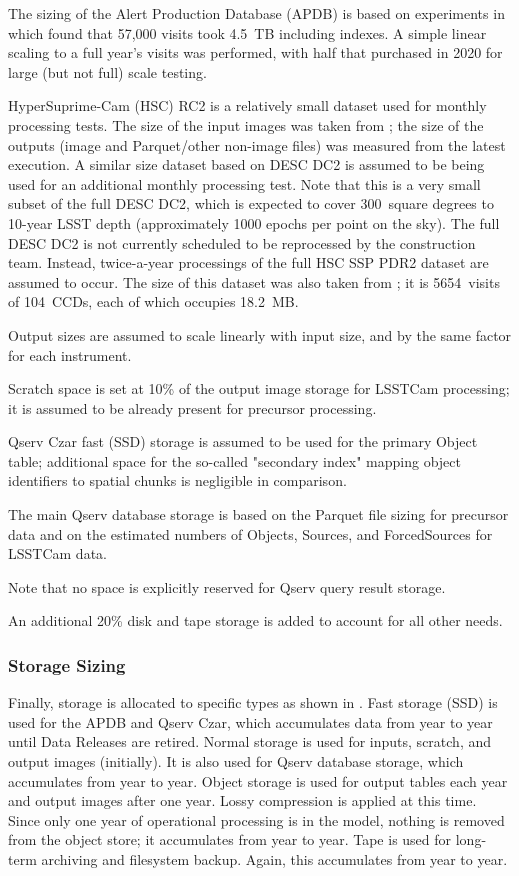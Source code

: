 The sizing of the Alert Production Database (APDB) is based on experiments in \cite{DMTN-113} which found that 57,000 visits took 4.5~TB including indexes.
A simple linear scaling to a full year's visits was performed, with half that purchased in 2020 for large (but not full) scale testing.

HyperSuprime-Cam (HSC) RC2 is a relatively small dataset used for monthly processing tests.
The size of the input images was taken from \cite{DMTN-091}; the size of the outputs (image and Parquet/other non-image files) was measured from the latest execution.
A similar size dataset based on DESC DC2 is assumed to be being used for an additional monthly processing test.
Note that this is a very small subset of the full DESC DC2, which is expected to cover 300~square degrees to 10-year LSST depth (approximately 1000 epochs per point on the sky).
The full DESC DC2 is not currently scheduled to be reprocessed by the construction team.
Instead, twice-a-year processings of the full HSC SSP PDR2 dataset are assumed to occur.
The size of this dataset was also taken from \cite{DMTN-091}; it is 5654~visits of 104~CCDs, each of which occupies 18.2~MB.

Output sizes are assumed to scale linearly with input size, and by the same factor for each instrument.

Scratch space is set at 10\% of the output image storage for LSSTCam processing; it is assumed to be already present for precursor processing.

Qserv Czar fast (SSD) storage is assumed to be used for the primary Object table; additional space for the so-called "secondary index" mapping object identifiers to spatial chunks is negligible in comparison.

The main Qserv database storage is based on the Parquet file sizing for precursor data and on the estimated numbers of Objects, Sources, and ForcedSources for LSSTCam data.

Note that no space is explicitly reserved for Qserv query result storage.

An additional 20\% disk and tape storage is added to account for all other needs.



\subsubsection{Storage Sizing}
Finally, storage is allocated to specific types as shown in .
Fast storage (SSD) is used for the APDB and Qserv Czar, which accumulates data from year to year until Data Releases are retired.
Normal storage is used for inputs, scratch, and output images (initially).
It is also used for Qserv database storage, which accumulates from year to year.
Object storage is used for output tables each year and output images after one year.
Lossy compression is applied at this time.
Since only one year of operational processing is in the model, nothing is removed from the object store; it accumulates from year to year.
Tape is used for long-term archiving and filesystem backup.
Again, this accumulates from year to year.

